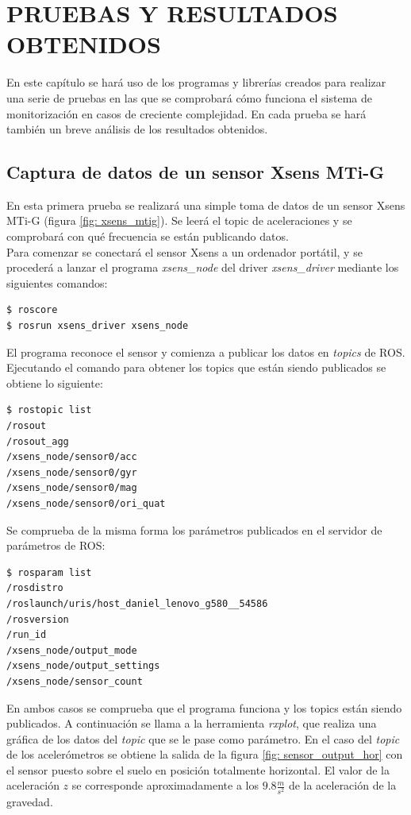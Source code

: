 \documentclass[12pt, a4paper]{report}
\begin{document}
\chapter{PRUEBAS Y RESULTADOS OBTENIDOS}

En este capítulo se hará uso de los programas y librerías creados para realizar una serie de pruebas en las que se comprobará cómo funciona el sistema de monitorización en casos de creciente complejidad. En cada prueba se hará también un breve análisis de los resultados obtenidos.

\section{Captura de datos de un sensor Xsens MTi-G}

En esta primera prueba se realizará una simple toma de datos de un sensor Xsens MTi-G (figura \ref{fig: xsens_mtig}). Se leerá el topic de aceleraciones y se comprobará con qué frecuencia se están publicando datos.\\

Para comenzar se conectará el sensor Xsens a un ordenador portátil, y se procederá a lanzar el programa \textit{xsens\_node} del driver \textit{xsens\_driver} mediante los siguientes comandos:

\begin{verbatim}
$ roscore
$ rosrun xsens_driver xsens_node
\end{verbatim}

El programa reconoce el sensor y comienza a publicar los datos en \textit{topics} de ROS. Ejecutando el comando para obtener los topics que están siendo publicados se obtiene lo siguiente:

\begin{verbatim}
$ rostopic list
/rosout
/rosout_agg
/xsens_node/sensor0/acc
/xsens_node/sensor0/gyr
/xsens_node/sensor0/mag
/xsens_node/sensor0/ori_quat
\end{verbatim}

Se comprueba de la misma forma los parámetros publicados en el servidor de parámetros de ROS:

\begin{verbatim}
$ rosparam list
/rosdistro
/roslaunch/uris/host_daniel_lenovo_g580__54586
/rosversion
/run_id
/xsens_node/output_mode
/xsens_node/output_settings
/xsens_node/sensor_count
\end{verbatim}

En ambos casos se comprueba que el programa funciona y los topics están siendo publicados. A continuación se llama a la herramienta \textit{rxplot}, que realiza una gráfica de los datos del \textit{topic} que se le pase como parámetro. En el caso del \textit{topic} de los acelerómetros se obtiene la salida de la figura \ref{fig: sensor_output_hor} con el sensor puesto sobre el suelo en posición totalmente horizontal. El valor de la aceleración $z$ se corresponde aproximadamente a los $9.8 \frac{m}{s^2}$ de la aceleración de la gravedad.
\end{document}
